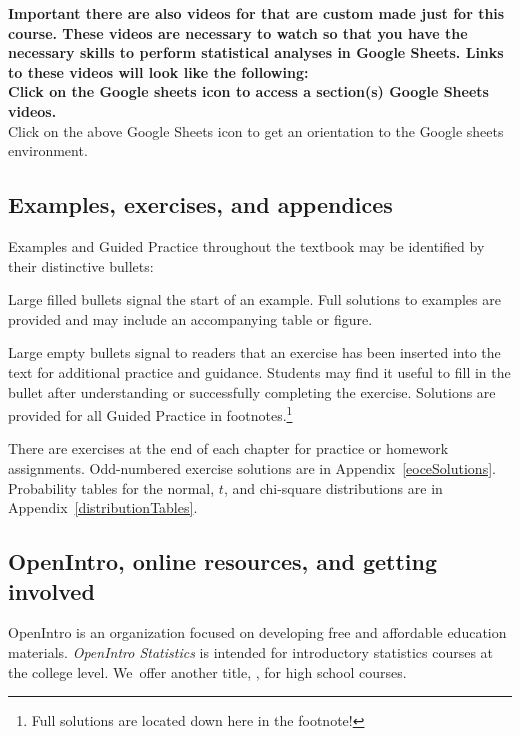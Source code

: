 \textbf{Important there are also videos for that are custom made just for this course. These videos are necessary to watch so that you have the necessary skills to perform statistical analyses in Google Sheets. Links to these videos will look like the following: } \\

\noindent\Large{\textbf{ {\color{ForestGreen} Click on the Google sheets icon to access a section(s) Google Sheets videos.}}} 
\normalsize \\

Click on the above Google Sheets icon to get an orientation to the Google sheets environment.

\subsection*{Examples, exercises, and appendices}

Examples and Guided Practice throughout the textbook may be identified by their distinctive bullets:

\begin{example}{Large filled bullets signal the start of an example.}
Full solutions to examples are provided and may include an accompanying table or figure.
 \end{example}

\begin{exercise}
Large empty bullets signal to readers that an exercise has been inserted into the text for additional practice and guidance. Students may find it useful to fill in the bullet after understanding or successfully completing the exercise. Solutions are provided for all Guided Practice in footnotes.\footnote{Full solutions are located down here in the footnote!}
\end{exercise}

There are exercises at the end of each chapter for practice or homework assignments. Odd-numbered exercise solutions are in Appendix~\ref{eoceSolutions}. Probability tables for the normal, $t$, and chi-square distributions are in Appendix~\ref{distributionTables}.

\subsection*{OpenIntro, online resources, and getting involved}

OpenIntro is an organization focused on developing free and affordable education materials. \emph{OpenIntro Statistics} is intended for introductory statistics courses at the college level. We~offer another title, , for high school courses.

